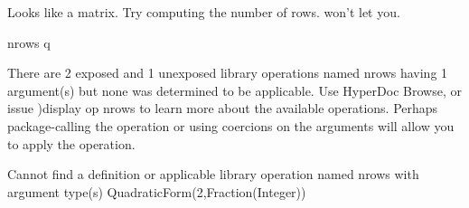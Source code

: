 {{{{\begin{xtc}
\begin{xtccomment}
Looks like a matrix. Try computing
the number of rows.
\Language{} won't let you.
\end{xtccomment}
\begin{spadsrc}
nrows q
\end{spadsrc}
\begin{MessageOutput}
   There are 2 exposed and 1 unexposed library operations named nrows 
      having 1 argument(s) but none was determined to be applicable. 
      Use HyperDoc Browse, or issue
                              )display op nrows
      to learn more about the available operations. Perhaps 
      package-calling the operation or using coercions on the arguments
      will allow you to apply the operation.
\end{MessageOutput}
\begin{MessageOutput}
   Cannot find a definition or applicable library operation named nrows
      with argument type(s) 
                     QuadraticForm(2,Fraction(Integer))
      

\end{MessageOutput}
\end{xtc}}}}}
